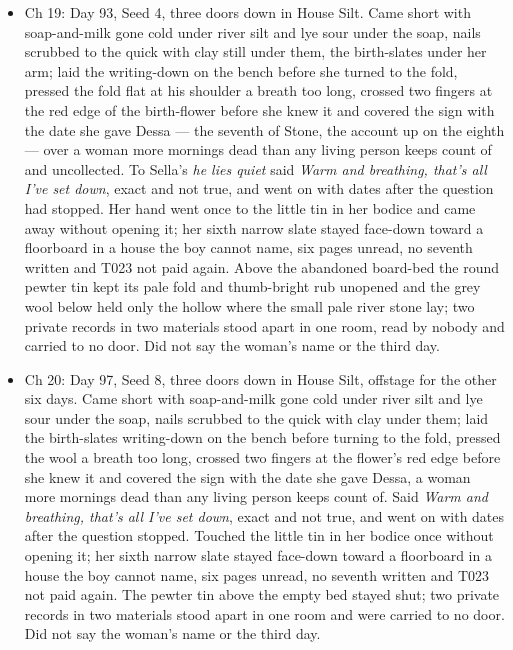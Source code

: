 \documentclass{design/chronicle}
\begin{document}
{\begin{itemize}[leftmargin=1.4em,itemsep=1pt,topsep=3pt,parsep=0pt]
\item Ch 19: Day 93, Seed 4, three doors down in House Silt. Came short with soap-and-milk gone cold under river silt and lye sour under the soap, nails scrubbed to the quick with clay still under them, the birth-slates under her arm; laid the writing-down on the bench before she turned to the fold, pressed the fold flat at his shoulder a breath too long, crossed two fingers at the red edge of the birth-flower before she knew it and covered the sign with the date she gave Dessa --- the seventh of Stone, the account up on the eighth --- over a woman more mornings dead than any living person keeps count of and uncollected. To Sella’s \emph{he lies quiet} said \emph{Warm and breathing, that’s all I’ve set down}, exact and not true, and went on with dates after the question had stopped. Her hand went once to the little tin in her bodice and came away without opening it; her sixth narrow slate stayed face-down toward a floorboard in a house the boy cannot name, six pages unread, no seventh written and T023 not paid again. Above the abandoned board-bed the round pewter tin kept its pale fold and thumb-bright rub unopened and the grey wool below held only the hollow where the small pale river stone lay; two private records in two materials stood apart in one room, read by nobody and carried to no door. Did not say the woman’s name or the third day.

\end{itemize}

\begin{itemize}[leftmargin=1.4em,itemsep=1pt,topsep=3pt,parsep=0pt]

\item Ch 20: Day 97, Seed 8, three doors down in House Silt, offstage for the other six days. Came short with soap-and-milk gone cold under river silt and lye sour under the soap, nails scrubbed to the quick with clay under them; laid the birth-slates writing-down on the bench before turning to the fold, pressed the wool a breath too long, crossed two fingers at the flower’s red edge before she knew it and covered the sign with the date she gave Dessa, a woman more mornings dead than any living person keeps count of. Said \emph{Warm and breathing, that’s all I’ve set down}, exact and not true, and went on with dates after the question stopped. Touched the little tin in her bodice once without opening it; her sixth narrow slate stayed face-down toward a floorboard in a house the boy cannot name, six pages unread, no seventh written and T023 not paid again. The pewter tin above the empty bed stayed shut; two private records in two materials stood apart in one room and were carried to no door. Did not say the woman’s name or the third day.

\end{itemize}
}
\end{document}
